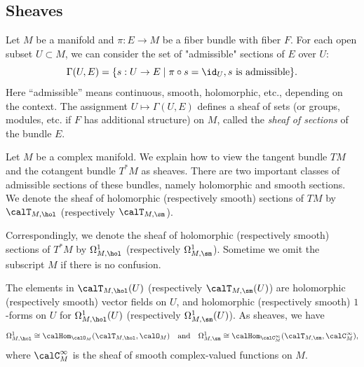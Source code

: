\subsection{Sheaves}


\begin{construction}\label{cons:sheaf_of_sections_of_bundle}
	Let \(M\) be a manifold and \(\pi: E \to M\) be a fiber bundle with fiber \(F\).
	For each open subset \(U \subset M\), we can consider the set of "admissible" sections of \(E\) over \(U\):
	\[
		\Gamma(U,E) = \{ s: U \to E \mid \pi \circ s = \id_U, s \text{ is admissible} \}.
	\]
	Here ``admissible'' means continuous, smooth, holomorphic, etc., depending on the context.
	The assignment \(U \mapsto \Gamma(U,E)\) defines a sheaf of sets (or groups, modules, etc. if \(F\) has additional structure) on \(M\), called the \emph{sheaf of sections} of the bundle \(E\).
\end{construction}


\begin{example}\label{eg:tangent_and_cotangent_bundle_as_sheaves}
	Let \(M\) be a complex manifold.
	We explain how to view the tangent bundle \(TM\) and the cotangent bundle \(T^*M\) as sheaves.
	There are two important classes of admissible sections of these bundles, namely holomorphic and smooth sections.
	We denote the sheaf of holomorphic (respectively smooth) sections of \(TM\) by \(\calT_{M,\hol}\) (respectively \(\calT_{M,\sm}\)).

	Correspondingly, we denote the sheaf of holomorphic (respectively smooth) sections of \(T^*M\) by \(\Omega_{M,\hol}^1\) (respectively \(\Omega_{M,\sm}^1\)).
	Sometime we omit the subscript \(M\) if there is no confusion.


	The elements in \(\calT_{M,\hol}(U)\) (respectively \(\calT_{M,\sm}(U)\)) are holomorphic (respectively smooth) vector fields on \(U\),
	and holomorphic (respectively smooth) \(1\)-forms on \(U\) for \(\Omega_{M,\hol}^1(U)\) (respectively \(\Omega_{M,\sm}^1(U)\)).
	As sheaves, we have
	\[ \Omega_{M,\hol}^1 \cong \calHom_{\calO_M}(\calT_{M,\hol}, \calO_M) \quad \text{and} \quad \Omega_{M,\sm}^1 \cong \calHom_{\calC_M^\infty}(\calT_{M,\sm}, \calC_M^\infty), \]
	where \(\calC_M^\infty\) is the sheaf of smooth complex-valued functions on \(M\).
\end{example}

